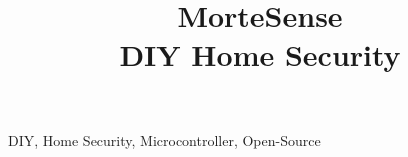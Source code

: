 \documentclass[conference]{IEEEtran}
\begin{document}
    \title{MorteSense \\DIY Home Security}
    
    \maketitle
    
    \begin{IEEEkeywords}
        DIY, Home Security, Microcontroller, Open-Source
    \end{IEEEkeywords}
    
    
    
    
    
    
    
    
    \vfill
    
    
\end{document}
